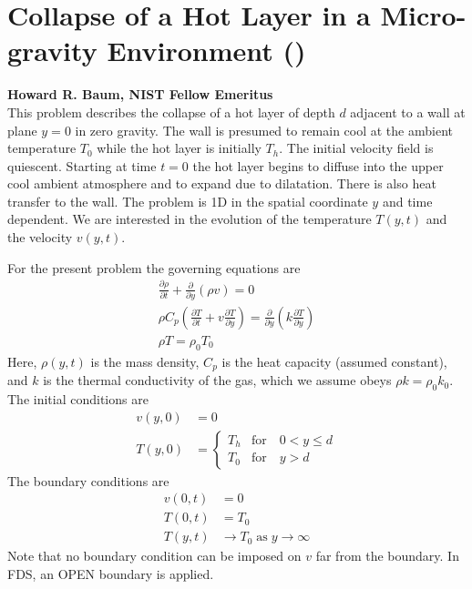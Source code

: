 \documentclass[11pt]{book}
\begin{document}
\section{Collapse of a Hot Layer in a Micro-gravity Environment (\texorpdfstring{}{hot\_layer\_360})}
\label{sec:baum_hot_layer}

\textbf{Howard R. Baum, NIST Fellow Emeritus}\\

\noindent This problem describes the collapse of a hot layer of depth $d$ adjacent to a wall at plane $y=0$ in zero gravity.  The wall is presumed to remain cool at the ambient temperature $T_0$ while the hot layer is initially $T_h$.  The initial velocity field is quiescent.  Starting at time $t=0$ the hot layer begins to diffuse into the upper cool ambient atmosphere and to expand due to dilatation.  There is also heat transfer to the wall.  The problem is 1D in the spatial coordinate $y$ and time dependent.  We are interested in the evolution of the temperature $T(y,t)$ and the velocity $v(y,t)$.

For the present problem the governing equations are
\begin{gather}
\frac{\partial \rho}{\partial t} + \frac{\partial}{\partial y}(\rho v) = 0 \\
\rho C_p \left( \frac{\partial T}{\partial t} + v \frac{\partial T}{\partial y} \right) = \frac{\partial}{\partial y} \left( k \frac{\partial T}{\partial y} \right) \\
\rho T = \rho_0 T_0
\end{gather}
Here, $\rho(y,t)$ is the mass density, $C_p$ is the heat capacity (assumed constant), and $k$ is the thermal conductivity of the gas, which we assume obeys $\rho k = \rho_0 k_0$. The initial conditions are
\begin{align}
v(y,0) &= 0 \\
T(y,0) &= \left\{ \begin{array}{ll} T_h & \mbox{for} \quad 0 < y \le d \\ T_0 & \mbox{for} \quad y > d \end{array} \right.
\end{align}
The boundary conditions are
\begin{align}
v(0,t) &= 0 \\
T(0,t) &= T_0 \\
T(y,t) &\rightarrow T_0 \;\mbox{as}\; y\rightarrow\infty
\end{align}
Note that no boundary condition can be imposed on $v$ far from the boundary.  In FDS, an {\ct OPEN} boundary is applied.
\end{document}
